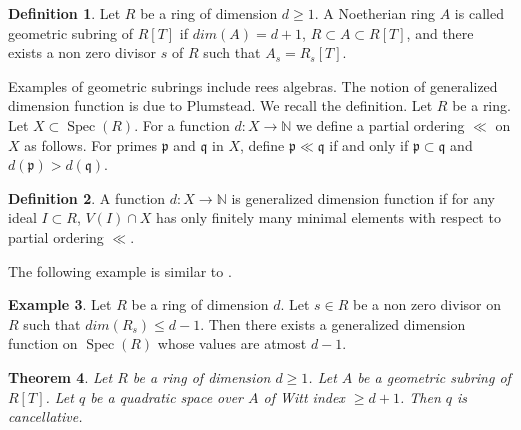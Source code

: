 \documentclass[11pt,a4paper]{amsart}
\theoremstyle{plain}
\newtheorem{thm}{Theorem}[section]
\theoremstyle{definition}
\newtheorem{defn}[thm]{Definition}
\newtheorem{ex}[thm]{Example}
\theoremstyle{remark}
\begin{document}
\begin{defn}\label{geometricsubring}
Let $R$ be a ring of dimension $d\geq 1$.  A Noetherian ring $A$ is called geometric subring of $R[T]$ if $dim(A)=d+1$, $R\subset A\subset R[T]$, and there exists a non zero divisor $s$ of $R$ such that $A_s=R_s[T].$
\end{defn}
Examples of geometric subrings include rees algebras. 
The notion of generalized dimension function is due to Plumstead. We recall the definition. Let $R$ be a ring. Let $X\subset \operatorname{Spec}(R)$. For a function $d:X\rightarrow \mathbb{N}$ we define a partial ordering $\ll$ on $X$ as follows. For primes $\mathfrak{p}$ and $\mathfrak{q}$ in $X$, define $\mathfrak{p} \ll \mathfrak{q}$ if and only if $\mathfrak{p} \subset \mathfrak{q}$ and $d(\mathfrak{p})> d(\mathfrak{q}).$ 
    \begin{defn}
        A function $d:X\rightarrow \mathbb{N}$ is generalized dimension function if for any ideal $I\subset R$, $V(I)\cap X$ has only finitely many minimal elements with respect to partial ordering $\ll.$
    \end{defn} 
    The following example is similar to \cite[Example 4]
    {plumstead1983conjectures}.
    \begin{ex}\label{gdf}
        Let $R$ be a ring of dimension $d$. Let $s\in R$ be a non zero divisor on $R$ such that $dim(R_s)\leq d-1$. Then there exists a generalized dimension function on $\operatorname{Spec}(R)$ whose values are atmost $d-1$.
    \end{ex}
\begin{thm}
    Let $R$ be a ring of dimension $d\geq 1$. Let $A$ be a geometric subring of $R[T]$. Let  $q$ be a quadratic space over $A$ of Witt index $\geq d+1$. Then $q$ is cancellative.  
\end{thm}
\end{document}
